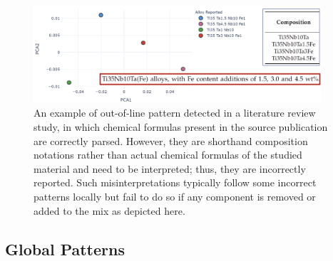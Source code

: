 \begin{figure}[H]
    \centering
    \includegraphics[width=0.95\textwidth]{pyqalloy/pyqalloy_CompositionNotation.png}
    \caption{An example of out-of-line pattern detected in a literature review study, in which chemical formulas present in the source publication \cite{Amigo2019MechanicalApplications} are correctly parsed. However, they are shorthand composition notations rather than actual chemical formulas of the studied material and need to be interpreted; thus, they are incorrectly reported. Such misinterpretations typically follow some incorrect patterns locally but fail to do so if any component is removed or added to the mix as depicted here.}
    \label{pyqalloy:fig:patternbreak2}
\end{figure}



\subsection{Global Patterns} \label{pyqalloy:ssec:global}

\todo

